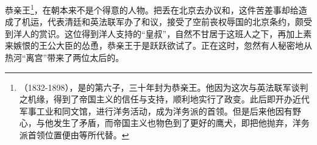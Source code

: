  恭亲王\footnote{（1832-1898），是的第六子，三十年封为恭亲王。他因为这次与英法联军谈判之机缘，得到了帝国主义的信任与支持，顺利地实行了政变。此后即开办近代军事工业和同文馆，进行洋务活动，成为洋务派的首领。但是后来他因有野心，与他发生了矛盾，而帝国主义也物色到了更好的鹰犬，即把他抛弃，洋务派首领位置便由等所代替。}，在朝本来不是个得意的人物。把丢在北京去办议和，这件苦差事却给造成了机运，代表清廷和英法联军办了和议，接受了空前丧权辱国的北京条约，颇受到洋人的赏识。这位得到洋人支持的“皇叔”，自然不甘居于这班人之下，再加上素来嫉恨的王公大臣的怂恿，恭亲王于是跃跃欲试了。正在这时，忽然有人秘密地从热河“离宫”带来了两位太后的。\\

